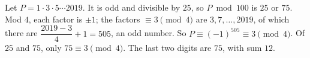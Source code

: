 Let $P=1\cdot3\cdot5\cdots2019$. It is odd and divisible by $25$, so $P\bmod100$ is $25$ or $75$. Mod $4$, each factor is $\pm1$; the factors $\equiv3\pmod4$ are $3,7,\dots,2019$, of which there are $\dfrac{2019-3}{4}+1=505$, an odd number. So $P\equiv(-1)^{505}\equiv3\pmod4$. Of $25$ and $75$, only $75\equiv3\pmod4$. The last two digits are $75$, with sum $\boxed{12}$.

